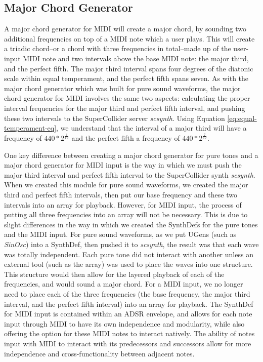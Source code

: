 \subsection{Major Chord Generator}

A major chord generator for MIDI will create a major chord, by sounding two additional frequencies on top of a MIDI note which a user plays. This will create a triadic chord--or a chord with three frequencies in total--made up of the user-input MIDI note and two intervals above the base MIDI note: the major third, and the perfect fifth. The major third interval spans four degrees of the diatonic scale within equal temperament, and the perfect fifth spans seven. As with the major chord generator which was built for pure sound waveforms, the major chord generator for MIDI involves the same two aspects: calculating the proper interval frequencies for the major third and perfect fifth interval, and pushing these two intervals to the SuperCollider server \textit{scsynth}. Using Equation \ref{eq:equal-temperament-eq}, we understand that the interval of a major third will have a frequency of $440 * 2^\frac{4}{12}$ and the perfect fifth a frequency of $440 * 2^\frac{7}{12}$.

One key difference between creating a major chord generator for pure tones and a major chord generator for MIDI input is the way in which we must push the major third interval and perfect fifth interval to the SuperCollider synth \textit{scsynth}. When we created this module for pure sound waveforms, we created the major third and perfect fifth intervals, then put our base frequency and these two intervals into an array for playback. However, for MIDI input, the process of putting all three frequencies into an array will not be necessary. This is due to slight differences in the way in which we created the SynthDefs for the pure tones and the MIDI input. For pure sound waveforms, as we put UGens (such as \textit{SinOsc}) into a SynthDef, then pushed it to \textit{scsynth}, the result was that each wave was totally independent. Each pure tone did not interact with another unless an external tool (such as the array) was used to place the waves into one structure. This structure would then allow for the layered playback of each of the frequencies, and would sound a major chord. For a MIDI input, we no longer need to place each of the three frequencies (the base frequency, the major third interval, and the perfect fifth interval) into an array for playback. The SynthDef for MIDI input is contained within an ADSR envelope, and allows for each note input through MIDI to have its own independence and modularity, while also offering the option for these MIDI notes to interact natively. The ability of notes input with MIDI to interact with its predecessors and successors allow for more independence and cross-functionality between adjacent notes.

